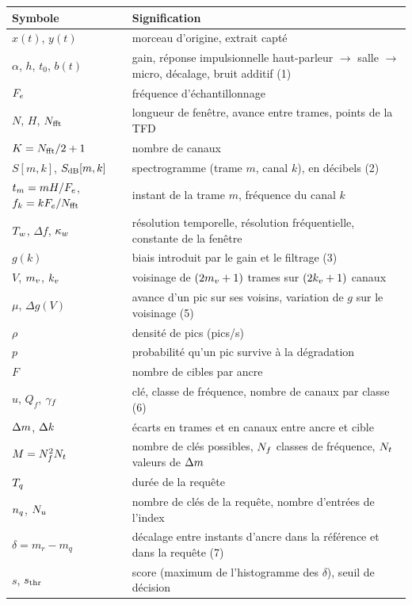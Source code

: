 \begin{center}\small
\begin{tabularx}{\linewidth}{@{}lX@{}}
  \toprule
  Symbole & Signification \\
  \midrule
  $x(t)$, $y(t)$ & morceau d'origine, extrait capté \\
  $\alpha$, $h$, $t_0$, $b(t)$ & gain, réponse impulsionnelle haut-parleur $\to$ salle $\to$ micro, décalage, bruit additif (1) \\
  $F_e$ & fréquence d'échantillonnage \\
  $N$, $H$, $N_{\mathrm{fft}}$ & longueur de fenêtre, avance entre trames, points de la TFD \\
  $K = N_{\mathrm{fft}}/2 + 1$ & nombre de canaux \\
  $S[m,k]$, $S_{\mathrm{dB}}[m,k]$ & spectrogramme (trame $m$, canal $k$), en décibels (2) \\
  $t_m = mH/F_e$, $f_k = kF_e/N_{\mathrm{fft}}$ & instant de la trame $m$, fréquence du canal $k$ \\
  $T_w$, $\Delta f$, $\kappa_w$ & résolution temporelle, résolution fréquentielle, constante de la fenêtre \\
  $g(k)$ & biais introduit par le gain et le filtrage (3) \\
  $V$, $m_v$, $k_v$ & voisinage de $(2m_v+1)$ trames sur $(2k_v+1)$ canaux \\
  $\mu$, $\Delta g(V)$ & avance d'un pic sur ses voisins, variation de $g$ sur le voisinage (5) \\
  $\rho$ & densité de pics (pics/s) \\
  $p$ & probabilité qu'un pic survive à la dégradation \\
  $F$ & nombre de cibles par ancre \\
  $u$, $Q_f$, $\gamma_f$ & clé, classe de fréquence, nombre de canaux par classe (6) \\
  $\Delta m$, $\Delta k$ & écarts en trames et en canaux entre ancre et cible \\
  $M = N_f^2N_t$ & nombre de clés possibles, $N_f$ classes de fréquence, $N_t$ valeurs de $\Delta m$ \\
  $T_q$ & durée de la requête \\
  $n_q$, $N_u$ & nombre de clés de la requête, nombre d'entrées de l'index \\
  $\delta = m_r - m_q$ & décalage entre instants d'ancre dans la référence et dans la requête (7) \\
  $s$, $s_{\mathrm{thr}}$ & score (maximum de l'histogramme des $\delta$), seuil de décision \\

\end{tabularx}
\end{center}
